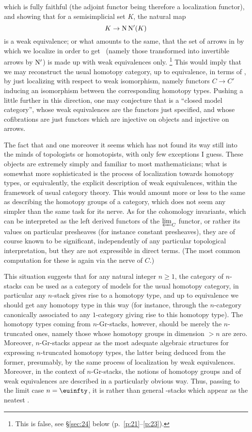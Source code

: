 which is fully faithful (the adjoint functor being therefore a
localization functor), and showing that for a semisimplicial set $K$,
the natural map
\[ K \to \mathrm{N}\,\mathrm{N}' (K) \]
is a weak equivalence; or what amounts to the same, that the set of
arrows in \Sssets{} by which we localize in order to get \Cat\ (namely
those transformed into invertible arrows by $\mathrm{N}'$) is made up with
weak equivalences only.%
\footnote{ This is false, see \S\ref{sec:24} below
  (p.~\ref{p:21}--\ref{p:23}).} This would imply
that we may reconstruct the usual homotopy category, up to
equivalence, in terms of \Cat, by just localizing \Cat{}
with respect to weak isomorphism, namely functors $C \to C'$ inducing
an isomorphism between the corresponding homotopy types. Pushing a
little further in this direction, one may conjecture that \Cat{} is a
``closed model category'', whose weak equivalences are the functors
just specified, and whose cofibrations are just functors which are
injective on objects and injective on arrows.

The fact that  and one moreover it seems which has
not found its way still into the minds of topologists or homotopists,
with only few exceptions I guess. These objects are extremely simply
and familiar to most mathematicians; what is somewhat more
sophisticated is the process of localization towards homotopy types,
or equivalently, the explicit description of weak equivalences, within
the framework of usual category theory. This would amount more or less
to the same as describing the homotopy groups of a category, which
does not seem any simpler than the same task for its nerve. As for the
cohomology invariants, which can be interpreted as the left derived
functors of the $\varprojlim_C$ functor, or rather its values on
particular presheaves (for instance constant presheaves), they are of
course known to be significant, independently of any particular
topological interpretation, but they are not expressible in direct
terms. (The most common computation for these is again via the nerve
of $C$.)

This situation suggests that for any natural integer $n\ge1$, the
category of $n$-stacks can be used as a category of models for the
usual homotopy category, in particular any $n$-stack gives rise to a
homotopy type, and up to equivalence we should get any homotopy type
in this way (for instance, through the $n$-category canonically
associated to any $1$-category giving rise to this homotopy type). The
homotopy types coming from $n$-Gr-stacks, however, should be merely
the $n$-truncated ones, namely those whose homotopy groups in
dimension $>n$ are zero. Moreover, $n$-Gr-stacks appear as the most
adequate algebraic structures for expressing $n$-truncated homotopy
types, the latter being deduced from the former, presumably, by the
same process of localization by weak equivalences. Moreover, in the
context of $n$-Gr-stacks, the notions of homotopy groups and of weak
equivalences are described in a particularly obvious way. Thus,
passing to the limit case $n=\oo$, it is
 rather than general \oo-stacks which
appear as the neatest .

